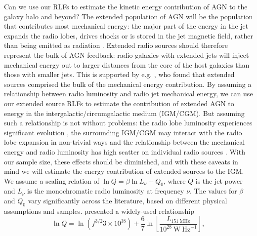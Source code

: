 \documentclass[11pt, a4paper]{book}
\begin{document}
      Can we use our RLFs to estimate the kinetic energy contribution of AGN to the galaxy halo and beyond? The extended population of AGN will be the population that contributes most mechanical energy: the major part of the energy in the jet expands the radio lobes, drives shocks or is stored in the jet magnetic field, rather than being emitted as radiation \citep{godfrey16power, hardcastle14lobes}. Extended radio sources should therefore represent the bulk of AGN feedback: radio galaxies with extended jets will inject mechanical energy out to larger distances from the core of the host galaxies than those with smaller jets. This is supported by e.g. \citet{turner15agn}, who found that extended sources comprised the bulk of the mechanical energy contribution. By assuming a relationship between radio luminosity and radio jet mechanical energy, we can use our extended source RLFs to estimate the contribution of extended AGN to energy in the intergalactic/circumgalactic medium (IGM/CGM). But assuming such a relationship is not without problems: the radio lobe luminosity experiences significant evolution \citep[e.g.][]{bicknell97css}, the surrounding IGM/CGM may interact with the radio lobe expansion in non-trivial ways \citep[e.g.][]{hardcastle13lobes} and the relationship between the mechanical energy and radio luminosity has high scatter on individual radio sources \citep{hardcastle13lobes}. With our sample size, these effects should be diminished, and with these caveats in mind we will estimate the energy contribution of extended sources to the IGM. We assume a scaling relation of $\ln Q = \beta \ln L_\nu + Q_0$, where $Q$ is the jet power and $L_\nu$ is the monochromatic radio luminosity at frequency $\nu$. The values for $\beta$ and $Q_0$ vary significantly across the literature, based on different physical assumptions and samples. \citet{willott99radio} presented a widely-used relationship
      \begin{equation}
        \ln Q = \ln (f^{3/2} 3 \times 10^{38}) + \frac{6}{7} \ln \left[\frac{L_{151~\mathrm{MHz}}}{10^{28}~\mathrm{W\ Hz}^{-1}}\right],
      \end{equation}
\end{document}
